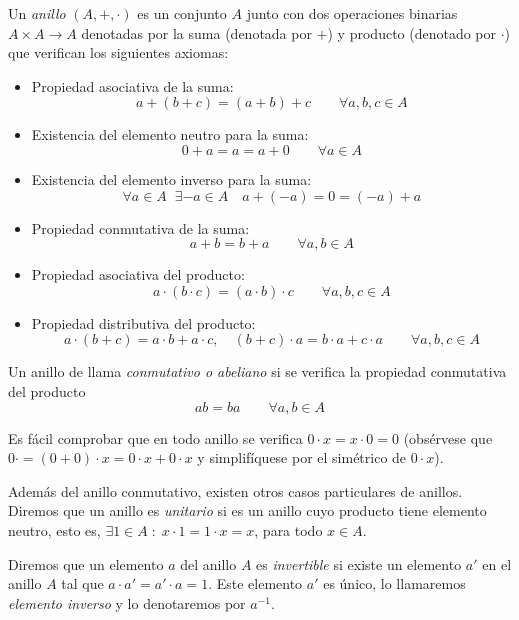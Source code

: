\begin{definition}
    Un \emph{anillo} $(A, +, \cdot )$ es un conjunto $A$ junto con dos operaciones binarias $A \times A \rightarrow A$ denotadas por la suma (denotada por $+$) y producto (denotado por $\cdot$) que verifican los siguientes axiomas:

    \begin{itemize}
        \item Propiedad asociativa de la suma: 
        $$  a + (b + c) = (a + b) + c \qquad \forall a,b,c \in A$$
        \item Existencia del elemento neutro para la suma:
        $$ 0 + a = a = a + 0 \qquad \forall a \in A$$
        \item Existencia del elemento inverso para la suma:
        $$ \forall a \in A \; \; \exists -a \in A \quad a + (-a) = 0 = (-a) + a $$
        \item Propiedad conmutativa de la suma:
        $$ a + b = b + a \qquad \forall a,b \in A $$
        \item Propiedad asociativa del producto:
        $$ a \cdot (b \cdot c) = (a \cdot b) \cdot c \qquad \forall a,b,c \in A $$
        \item Propiedad distributiva del producto:
        $$ a \cdot (b + c) = a \cdot b + a \cdot c, \quad (b + c) \cdot a = b \cdot a + c \cdot a \qquad \forall a,b,c \in A $$
        
    \end{itemize}

    Un anillo de llama \emph{conmutativo o abeliano} si se verifica la propiedad conmutativa del producto 
    $$ ab = ba \qquad \forall a,b \in A $$
\end{definition}

Es fácil comprobar que en todo anillo se verifica $0 \cdot x = x \cdot 0 = 0$ (obsérvese que $0 \cdot = (0 + 0) \cdot x = 0 \cdot x + 0 \cdot x$ y simplifíquese por el simétrico de $0 \cdot x$).

Además del anillo conmutativo, existen otros casos particulares de anillos. Diremos que un anillo es \emph{unitario} si es un anillo cuyo producto tiene elemento neutro, esto es, $\exists 1 \in A \; : \; x \cdot 1 = 1 \cdot x = x$, para todo $x \in A$.

Diremos que un elemento $a$ del anillo $A$ es \emph{invertible} si existe un elemento $a'$ en el anillo $A$ tal que $a \cdot a' = a' \cdot a = 1$. Este elemento $a'$ es único, lo llamaremos \emph{elemento inverso} y lo denotaremos por $a^{-1}$.

